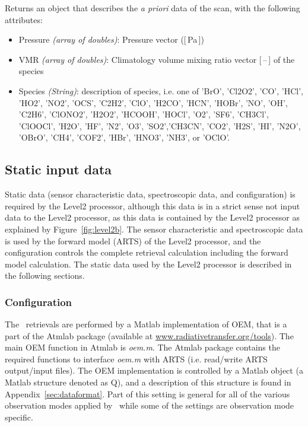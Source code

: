 Returns an object that describes the \textit{a priori} data of the scan,
with the following attributes:

\begin{itemize}
    \item Pressure \emph{(array of doubles)}: Pressure vector ([\,Pa\,])
    \item VMR \emph{(array of doubles)}: Climatology volume mixing ratio vector [\,--\,] of the species
    \item Species \emph{(String)}: description of species, i.e. one of 'BrO', 'Cl2O2', 'CO',
          'HCl', 'HO2', 'NO2', 'OCS', 'C2H2', 'ClO', 'H2CO', 'HCN', 'HOBr', 'NO', 'OH', 'C2H6',
          'ClONO2', 'H2O2', 'HCOOH', 'HOCl', 'O2', 'SF6', 'CH3Cl', 'ClOOCl', 'H2O', 'HF', 'N2', 'O3',
          'SO2','CH3CN', 'CO2', 'H2S', 'HI', 'N2O', 'OBrO', 'CH4', 'COF2', 'HBr', 'HNO3', 'NH3', or 'OClO'.
\end{itemize}



\subsection{Static input data}
\label{sec:static}
Static data (sensor characteristic data, spectroscopic data, and configuration)
is required by the Level2 processor, although this data is in a strict
sense not input data to the Level2 processor, as this data
is contained by the Level2 processor as explained by Figure~\ref{fig:level2b}.
The sensor characteristic and spectroscopic data
is used by the forward model (ARTS) of the Level2 processor,
and the configuration controls the complete retrieval
calculation including the forward model calculation.  
The static data used by the Level2 processor is 
described in the following sections.
 

\subsubsection{Configuration}

The \smr\ retrievals are performed by a Matlab implementation of OEM,
that is a part of the Atmlab package (available at \url{www.radiativetransfer.org/tools}).
The main OEM function in Atmlab is \emph{oem.m}. 
The Atmlab package contains the required functions to interface \emph{oem.m} with ARTS
(i.e. read/write ARTS output/input files).
The OEM implementation is controlled by a Matlab object
(a Matlab structure denoted as Q), and  
a description of this structure is found in Appendix~\ref{sec:dataformat}.
Part of this setting is general for all of the various 
observation modes applied by \smr\, while some of the settings
are observation mode specific.


